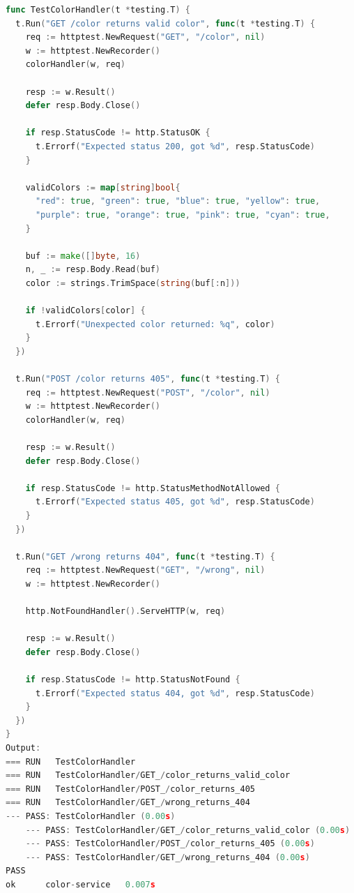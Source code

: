 \begin{lstlisting}[language=go, 
  basicstyle=\footnotesize\ttfamily, 
  caption={Kode Unit Testing Pada Color Service}, 
  label={lst:unit-test-color-service}
]
func TestColorHandler(t *testing.T) {
  t.Run("GET /color returns valid color", func(t *testing.T) {
    req := httptest.NewRequest("GET", "/color", nil)
    w := httptest.NewRecorder()
    colorHandler(w, req)

    resp := w.Result()
    defer resp.Body.Close()

    if resp.StatusCode != http.StatusOK {
      t.Errorf("Expected status 200, got %d", resp.StatusCode)
    }

    validColors := map[string]bool{
      "red": true, "green": true, "blue": true, "yellow": true,
      "purple": true, "orange": true, "pink": true, "cyan": true,
    }

    buf := make([]byte, 16)
    n, _ := resp.Body.Read(buf)
    color := strings.TrimSpace(string(buf[:n]))

    if !validColors[color] {
      t.Errorf("Unexpected color returned: %q", color)
    }
  })

  t.Run("POST /color returns 405", func(t *testing.T) {
    req := httptest.NewRequest("POST", "/color", nil)
    w := httptest.NewRecorder()
    colorHandler(w, req)

    resp := w.Result()
    defer resp.Body.Close()

    if resp.StatusCode != http.StatusMethodNotAllowed {
      t.Errorf("Expected status 405, got %d", resp.StatusCode)
    }
  })

  t.Run("GET /wrong returns 404", func(t *testing.T) {
    req := httptest.NewRequest("GET", "/wrong", nil)
    w := httptest.NewRecorder()

    http.NotFoundHandler().ServeHTTP(w, req)

    resp := w.Result()
    defer resp.Body.Close()

    if resp.StatusCode != http.StatusNotFound {
      t.Errorf("Expected status 404, got %d", resp.StatusCode)
    }
  })
}
Output:
=== RUN   TestColorHandler
=== RUN   TestColorHandler/GET_/color_returns_valid_color
=== RUN   TestColorHandler/POST_/color_returns_405
=== RUN   TestColorHandler/GET_/wrong_returns_404
--- PASS: TestColorHandler (0.00s)
    --- PASS: TestColorHandler/GET_/color_returns_valid_color (0.00s)
    --- PASS: TestColorHandler/POST_/color_returns_405 (0.00s)
    --- PASS: TestColorHandler/GET_/wrong_returns_404 (0.00s)
PASS
ok      color-service   0.007s
\end{lstlisting}

